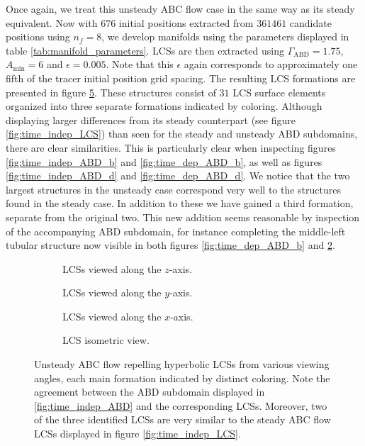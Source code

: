 Once again, we treat this unsteady ABC flow case in the same way as its steady equivalent. Now with $676$ initial positions extracted from $361461$ candidate positions using $n_f=8$, we develop manifolds using the parameters displayed in table \ref{tab:manifold_parameters}. LCSs are then extracted using $\Gamma_{\text{ABD}}=1.75$, $A_{\text{min}}=6$ and $\epsilon=0.005$. Note that this $\epsilon$ again corresponds to approximately one fifth of the tracer initial position grid spacing. The resulting LCS formations are presented in figure \ref{fig:time_dep_LCS}. These structures consist of $31$ LCS surface elements organized into three separate formations indicated by coloring. Although displaying larger differences from its steady counterpart (see figure \ref{fig:time_indep_LCS}) than seen for the steady and unsteady ABD subdomains, there are clear similarities. This is particularly clear when inspecting figures \ref{fig:time_indep_ABD_b} and \ref{fig:time_dep_ABD_b}, as well as figures  \ref{fig:time_indep_ABD_d} and \ref{fig:time_dep_ABD_d}. We notice that the two largest structures in the unsteady case correspond very well to the structures found in the steady case. In addition to these we have gained a third formation, separate from the original two. This new addition seems reasonable by inspection of the accompanying ABD subdomain, for instance completing the middle-left tubular structure now visible in both figures \ref{fig:time_dep_ABD_b} and \ref{fig:time_dep_LCS_b}. 

\begin{figure}[h!]

\centering
\begin{subfigure}[b]{0.45\textwidth}
\centering

\caption{LCSs viewed along the $z$-axis.}\label{fig:time_dep_LCS_a}
\end{subfigure}
\begin{subfigure}[b]{0.45\textwidth}
\centering

\caption{LCSs viewed along the $y$-axis.}\label{fig:time_dep_LCS_b}
\end{subfigure}
\begin{subfigure}[b]{0.45\textwidth}
\centering

\caption{LCSs viewed along the $x$-axis.}\label{fig:time_dep_LCS_c}
\end{subfigure}
\begin{subfigure}[b]{0.45\textwidth}
\centering

\caption{LCS isometric view.}\label{fig:time_dep_LCS_d}
\end{subfigure}

\caption{Unsteady ABC flow repelling hyperbolic LCSs from various viewing angles, each main formation indicated by distinct coloring. Note the agreement between the ABD subdomain displayed in \ref{fig:time_indep_ABD} and the corresponding LCSs. Moreover, two of the three identified LCSs are very similar to the steady ABC flow LCSs displayed in figure \ref{fig:time_indep_LCS}.}\label{fig:time_dep_LCS}
\end{figure}


